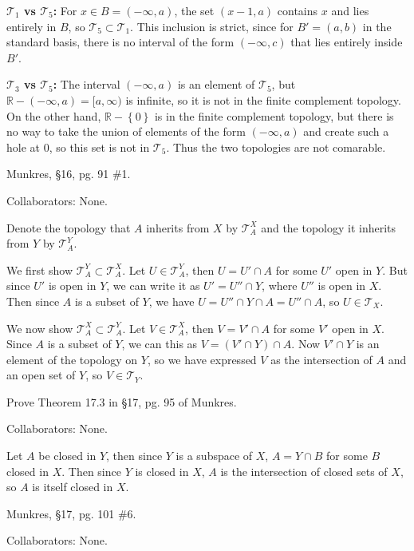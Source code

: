 \documentclass[10pt]{report}
\begin{document}
\textbf{$\mathcal{T}_1$ vs $\mathcal{T}_5$:} For $x \in B=(-\infty,a)$, the set $(x-1, a)$ contains $x$ and lies entirely in $B$, so $\mathcal{T}_5 \subset \mathcal{T}_1$. This inclusion is strict, since for $B'=(a,b)$ in the standard basis, there is no interval of the form $(-\infty,c)$ that lies entirely inside $B'$.

\textbf{$\mathcal{T}_3$ vs $\mathcal{T}_5$:} The interval $(-\infty,a)$ is an element of $\mathcal{T}_5$, but $\mathbb{R}-(-\infty,a)=[a,\infty)$ is infinite, so it is not in the finite complement topology. On the other hand, $\mathbb{R}-\left\{ 0 \right\}$ is in the finite complement topology, but there is no way to take the union of elements of the form $(-\infty,a)$ and create such a hole at 0, so this set is not in $\mathcal{T}_5$. Thus the two topologies are not comarable.


\begin{exer}[4 points]
	Munkres, \S 16, pg. 91 \#1.
\end{exer}
{\color{blue}Collaborators: None.}

Denote the topology that $A$ inherits from $X$ by $\mathcal{T}_A^X$ and the topology it inherits from $Y$ by $\mathcal{T}_A^Y$.

We first show $\mathcal{T}_A^Y \subset \mathcal{T}_A^X$. Let $U \in \mathcal{T}_A^Y$, then $U = U'\cap A$ for some $U'$ open in $Y$. But since $U'$ is open in $Y$, we can write it as $U' = U'' \cap Y$, where $U''$ is open in $X$. Then since $A$ is a subset of $Y$, we have $U = U'' \cap Y \cap A = U'' \cap A$, so $U \in \mathcal{T}_X$.

We now show $\mathcal{T}_A^X \subset \mathcal{T}_A^Y$. Let $V \in \mathcal{T}_A^X$, then $V = V'\cap A$ for some $V'$ open in $X$. Since $A$ is a subset of $Y$, we can this as $V = (V' \cap Y) \cap A$. Now $V' \cap Y$ is an element of the topology on $Y$, so we have expressed $V$ as the intersection of $A$ and an open set of $Y$, so $V \in \mathcal{T}_Y$.


\begin{exer}[5 points]
	Prove Theorem 17.3 in \S 17, pg. 95 of Munkres.
\end{exer}
{\color{blue}Collaborators: None.}

Let $A$ be closed in $Y$, then since $Y$ is a subspace of $X$, $A = Y \cap B$ for some $B$ closed in $X$. Then since $Y$ is closed in $X$, $A$ is the intersection of closed sets of $X$, so $A$ is itself closed in $X$.

\begin{exer}[5 points]
	Munkres, \S 17, pg. 101 \#6.
\end{exer}
{\color{blue}Collaborators: None.}
\end{document}
